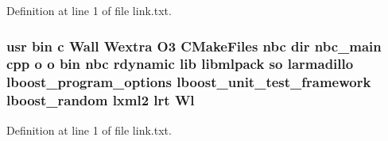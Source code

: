 Definition at line 1 of file link.\-txt.

\subsubsection[{Wl}]{\setlength{\rightskip}{0pt plus 5cm}usr bin c Wall Wextra O3 C\-Make\-Files nbc dir nbc\-\_\-main cpp o o bin nbc rdynamic lib libmlpack so larmadillo lboost\-\_\-program\-\_\-options lboost\-\_\-unit\-\_\-test\-\_\-framework lboost\-\_\-random lxml2 lrt Wl}\label{methods_2naive__bayes_2CMakeFiles_2nbc_8dir_2link_8txt_a1454ed436f46f63c6bb913c6755e7123}


Definition at line 1 of file link.\-txt.

